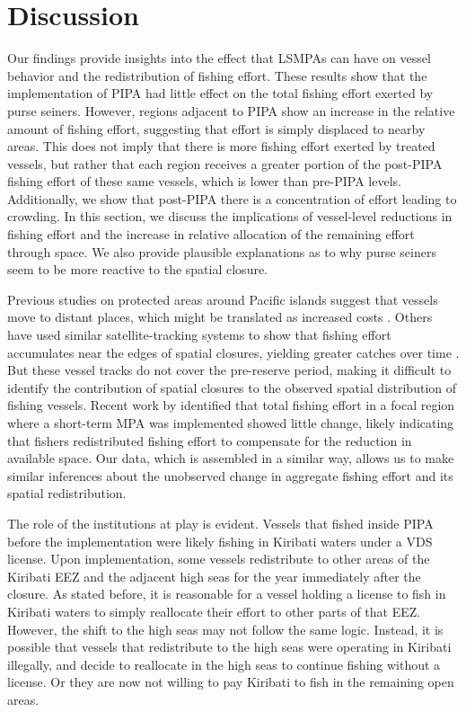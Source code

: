 \documentclass[9p,twocolumn,twoside,lineno]{pnas-new}
\begin{document}


\section{Discussion}

Our findings provide insights into the effect that LSMPAs can have on vessel behavior and the redistribution of fishing effort. These results show that the implementation of PIPA had little effect on the total fishing effort exerted by purse seiners. However, regions adjacent to PIPA show an increase in the relative amount of fishing effort, suggesting that effort is simply displaced to nearby areas. This does not imply that there is more fishing effort exerted by treated vessels, but rather that each region receives a greater portion of the post-PIPA fishing effort of these same vessels, which is lower than pre-PIPA levels. Additionally, we show that post-PIPA there is a concentration of effort leading to crowding. In this section, we discuss the implications of vessel-level reductions in fishing effort and the increase in relative allocation of the remaining effort through space. We also provide plausible explanations as to why purse seiners seem to be more reactive to the spatial closure. 

Previous studies on protected areas around Pacific islands suggest that vessels move to distant places, which might be translated as increased costs \citep{stevenson_2013}. Others have used similar satellite-tracking systems to show that fishing effort accumulates near the edges of spatial closures, yielding greater catches over time \citep{murawski_2005}. But these vessel tracks do not cover the pre-reserve period, making it difficult to identify the contribution of spatial closures to the observed spatial distribution of fishing vessels. Recent work by \cite{elahi_2018} identified that total fishing effort in a focal region where a short-term MPA was implemented showed little change, likely indicating that fishers redistributed fishing effort to compensate for the reduction in available space. Our data, which is assembled in a similar way, allows us to make similar inferences about the unobserved change in aggregate fishing effort and its spatial redistribution.

The role of the institutions at play is evident. Vessels that fished inside PIPA before the implementation were likely fishing in Kiribati waters under a VDS license. Upon implementation, some vessels redistribute to other areas of the Kiribati EEZ and the adjacent high seas for the year immediately after the closure. As stated before, it is reasonable for a vessel holding a license to fish in Kiribati waters to simply reallocate their effort to other parts of that EEZ. However, the shift to the high seas may not follow the same logic. Instead, it is possible that vessels that redistribute to the high seas were operating in Kiribati illegally, and decide to reallocate in the high seas to continue fishing without a license. Or they are now not willing to pay Kiribati to fish in the remaining open areas.
\end{document}
